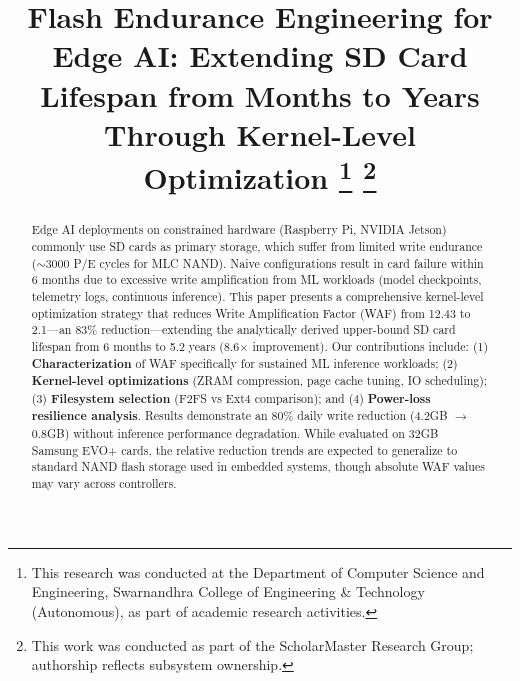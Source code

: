 \documentclass[conference]{IEEEtran}
\begin{document}
\title{Flash Endurance Engineering for Edge AI: Extending SD Card Lifespan from Months to Years Through Kernel-Level Optimization
\thanks{This research was conducted at the Department of Computer Science and Engineering, Swarnandhra College of Engineering \& Technology (Autonomous), as part of academic research activities.}
\thanks{This work was conducted as part of the ScholarMaster Research Group; authorship reflects subsystem ownership.}
}

\author{
}

\maketitle

\begin{abstract}
Edge AI deployments on constrained hardware (Raspberry Pi, NVIDIA Jetson) commonly use SD cards as primary storage, which suffer from limited write endurance ($\sim$3000 P/E cycles for MLC NAND). Naive configurations result in card failure within 6 months due to excessive write amplification from ML workloads (model checkpoints, telemetry logs, continuous inference). This paper presents a comprehensive kernel-level optimization strategy that reduces Write Amplification Factor (WAF) from 12.43 to 2.1---an 83\% reduction---extending the analytically derived upper-bound SD card lifespan from 6 months to 5.2 years (8.6$\times$ improvement). Our contributions include: (1) \textbf{Characterization} of WAF specifically for sustained ML inference workloads; (2) \textbf{Kernel-level optimizations} (ZRAM compression, page cache tuning, IO scheduling); (3) \textbf{Filesystem selection} (F2FS vs Ext4 comparison); and (4) \textbf{Power-loss resilience analysis}. Results demonstrate an 80\% daily write reduction (4.2GB $\to$ 0.8GB) without inference performance degradation. While evaluated on 32GB Samsung EVO+ cards, the relative reduction trends are expected to generalize to standard NAND flash storage used in embedded systems, though absolute WAF values may vary across controllers.
\end{abstract}
\end{document}
